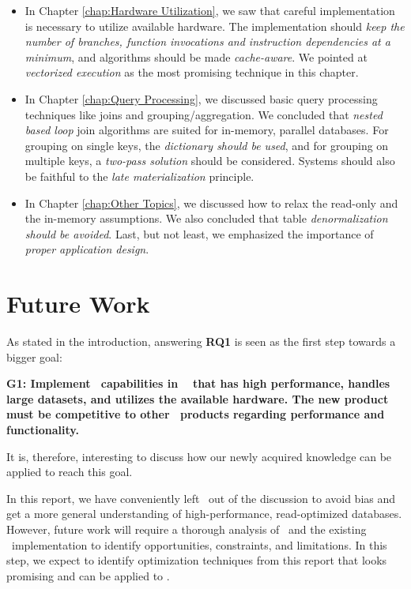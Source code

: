 \begin{itemize}
  \item In Chapter \ref{chap:Hardware Utilization}, we saw that careful implementation is necessary to utilize available hardware. The implementation should \textit{keep the number of branches, function invocations and instruction dependencies at a minimum}, and algorithms should be made \textit{cache-aware}. We pointed at \textit{vectorized execution} as the most promising technique in this chapter.

  \item In Chapter \ref{chap:Query Processing}, we discussed basic query processing techniques like joins and grouping/aggregation. We concluded that \textit{nested based loop} join algorithms are suited for in-memory, parallel databases. For grouping on single keys, the \textit{dictionary should be used}, and for grouping on multiple keys, a \textit{two-pass solution} should be considered. Systems should also be faithful to the \textit{late materialization} principle.

  \item In Chapter \ref{chap:Other Topics}, we discussed how to relax the read-only and the in-memory assumptions. We also concluded that table \textit{denormalization should be avoided}. Last, but not least, we emphasized the importance of \textit{proper application design}.
\end{itemize}

\section{Future Work}
\label{sec:Future Work}
As stated in the introduction, answering \textbf{RQ1} is seen as the first step towards a bigger goal:

\textbf{G1: Implement \bd~capabilities in \genusSoftware~ that has high performance, handles large datasets, and utilizes the available hardware. The new product must be competitive to other \bd~products regarding performance and functionality.}

It is, therefore, interesting to discuss how our newly acquired knowledge can be applied to reach this goal.

In this report, we have conveniently left \genusSoftware~out of the discussion to avoid bias and get a more general understanding of high-performance, read-optimized databases. However, future work will require a thorough analysis of \genusSoftware~and the existing \bd~implementation to identify opportunities, constraints, and limitations. In this step, we expect to identify optimization techniques from this report that looks promising and can be applied to \genusSoftware.

